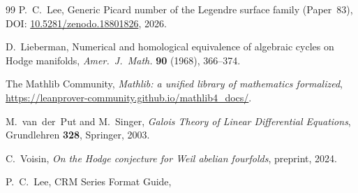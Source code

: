 \documentclass[11pt]{article}
\theoremstyle{plain}
\theoremstyle{definition}
\theoremstyle{remark}
\begin{document}
\begin{thebibliography}{99}
P.~C.~Lee,
Generic Picard number of the Legendre surface family (Paper~83),
DOI: \href{https://doi.org/10.5281/zenodo.18801826}{10.5281/zenodo.18801826}, 2026.

D.~Lieberman,
Numerical and homological equivalence of algebraic cycles on Hodge manifolds,
\emph{Amer.\ J.\ Math.} \textbf{90} (1968), 366--374.

The Mathlib Community,
\emph{Mathlib: a unified library of mathematics formalized},
\url{https://leanprover-community.github.io/mathlib4_docs/}.

M.~van~der~Put and M.~Singer,
\emph{Galois Theory of Linear Differential Equations},
Grundlehren \textbf{328}, Springer, 2003.

C.~Voisin,
\emph{On the Hodge conjecture for Weil abelian fourfolds},
preprint, 2024.

P.~C.~Lee,
CRM Series Format Guide,

\end{thebibliography}
\end{document}

